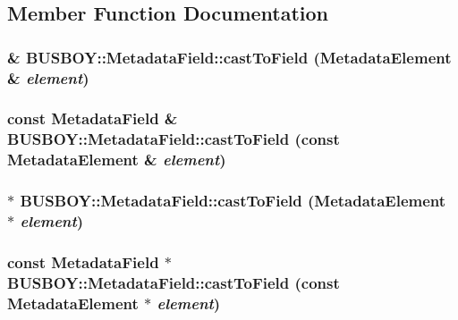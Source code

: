 \subsection{Member Function Documentation}
\hypertarget{classBUSBOY_1_1MetadataField_a57c47e720ab8dd57d916c3cddf6aa420}{
\subsubsection[{castToField}]{ \& BUSBOY::MetadataField::castToField ({\bf MetadataElement} \& {\em element})}}
\label{classBUSBOY_1_1MetadataField_a57c47e720ab8dd57d916c3cddf6aa420}
\hypertarget{classBUSBOY_1_1MetadataField_a0f34beae96515d48486521a9f1ae3159}{
\subsubsection[{castToField}]{\setlength{\rightskip}{0pt plus 5cm}const {\bf MetadataField} \& BUSBOY::MetadataField::castToField (const {\bf MetadataElement} \& {\em element})}}
\label{classBUSBOY_1_1MetadataField_a0f34beae96515d48486521a9f1ae3159}
\hypertarget{classBUSBOY_1_1MetadataField_a9cf4048adcafd51b26d8de1f730d82aa}{
\subsubsection[{castToField}]{ $\ast$ BUSBOY::MetadataField::castToField ({\bf MetadataElement} $\ast$ {\em element})}}
\label{classBUSBOY_1_1MetadataField_a9cf4048adcafd51b26d8de1f730d82aa}
\hypertarget{classBUSBOY_1_1MetadataField_a8189df76bbc8f4437d1d5d8751b4d45b}{
\subsubsection[{castToField}]{\setlength{\rightskip}{0pt plus 5cm}const {\bf MetadataField} $\ast$ BUSBOY::MetadataField::castToField (const {\bf MetadataElement} $\ast$ {\em element})}}
